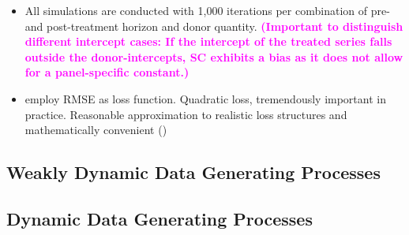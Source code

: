 \begin{itemize}
	\item All simulations are conducted with 1,000 iterations per combination of pre- and post-treatment horizon and donor quantity. \textcolor{magenta}{\textbf{(Important to distinguish different intercept cases: If the intercept of the treated series falls outside the donor-intercepts, SC exhibits a bias as it does not allow for a panel-specific constant.)}} 
	\item employ RMSE as loss function. Quadratic loss, tremendously important in practice. Reasonable approximation to realistic loss structures and mathematically convenient (\cite{diebold:2017})
\end{itemize}



\subsection{Weakly Dynamic Data Generating Processes}
\subsection{Dynamic Data Generating Processes}